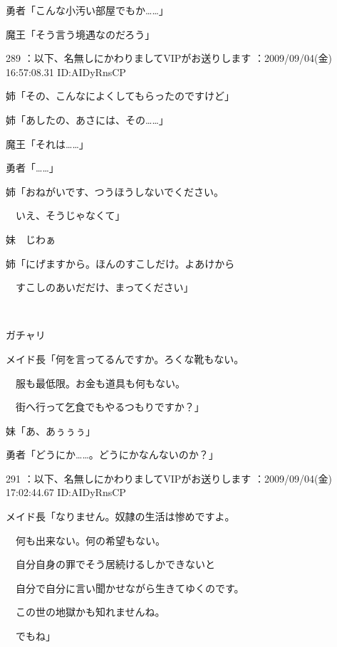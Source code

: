 \documentclass[a4j,twocolumn]{tarticle}
\begin{document}
勇者「こんな小汚い部屋でもか……」\par{} 
魔王「そう言う境遇なのだろう」 

	
    
    

289 ：以下、名無しにかわりましてVIPがお送りします ：2009/09/04(金) 16:57:08.31 ID:AIDyRnsCP 


姉「その、こんなによくしてもらったのですけど」 



姉「あしたの、あさには、その……」 



魔王「それは……」\par{} 
勇者「……」 



姉「おねがいです、つうほうしないでください。\par{} 
　いえ、そうじゃなくて」\par{} 
妹　じわぁ 



姉「にげますから。ほんのすこしだけ。よあけから\par{} 
　すこしのあいだだけ、まってください」 

　

ガチャリ 



メイド長「何を言ってるんですか。ろくな靴もない。\par{} 
　服も最低限。お金も道具も何もない。\par{} 
　街へ行って乞食でもやるつもりですか？」 



妹「あ、あぅぅぅ」 



勇者「どうにか……。どうにかなんないのか？」 

	
    
    

291 ：以下、名無しにかわりましてVIPがお送りします ：2009/09/04(金) 17:02:44.67 ID:AIDyRnsCP 


メイド長「なりません。奴隷の生活は惨めですよ。\par{} 
　何も出来ない。何の希望もない。\par{} 
　自分自身の罪でそう居続けるしかできないと\par{} 
　自分で自分に言い聞かせながら生きてゆくのです。\par{} 
　この世の地獄かも知れませんね。\par{} 
　でもね」 
\end{document}
